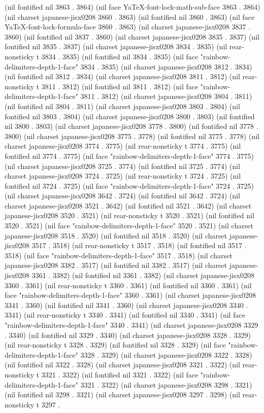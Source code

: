 (nil fontified nil 3863 . 3864) (nil face YaTeX-font-lock-math-sub-face 3863 . 3864) (nil charset japanese-jisx0208 3860 . 3863) (nil fontified nil 3860 . 3863) (nil face YaTeX-font-lock-formula-face 3860 . 3863) (nil charset japanese-jisx0208 3837 . 3860) (nil fontified nil 3837 . 3860) (nil charset japanese-jisx0208 3835 . 3837) (nil fontified nil 3835 . 3837) (nil charset japanese-jisx0208 3834 . 3835) (nil rear-nonsticky t 3834 . 3835) (nil fontified nil 3834 . 3835) (nil face "rainbow-delimiters-depth-1-face" 3834 . 3835) (nil charset japanese-jisx0208 3812 . 3834) (nil fontified nil 3812 . 3834) (nil charset japanese-jisx0208 3811 . 3812) (nil rear-nonsticky t 3811 . 3812) (nil fontified nil 3811 . 3812) (nil face "rainbow-delimiters-depth-1-face" 3811 . 3812) (nil charset japanese-jisx0208 3804 . 3811) (nil fontified nil 3804 . 3811) (nil charset japanese-jisx0208 3803 . 3804) (nil fontified nil 3803 . 3804) (nil charset japanese-jisx0208 3800 . 3803) (nil fontified nil 3800 . 3803) (nil charset japanese-jisx0208 3778 . 3800) (nil fontified nil 3778 . 3800) (nil charset japanese-jisx0208 3775 . 3778) (nil fontified nil 3775 . 3778) (nil charset japanese-jisx0208 3774 . 3775) (nil rear-nonsticky t 3774 . 3775) (nil fontified nil 3774 . 3775) (nil face "rainbow-delimiters-depth-1-face" 3774 . 3775) (nil charset japanese-jisx0208 3725 . 3774) (nil fontified nil 3725 . 3774) (nil charset japanese-jisx0208 3724 . 3725) (nil rear-nonsticky t 3724 . 3725) (nil fontified nil 3724 . 3725) (nil face "rainbow-delimiters-depth-1-face" 3724 . 3725) (nil charset japanese-jisx0208 3642 . 3724) (nil fontified nil 3642 . 3724) (nil charset japanese-jisx0208 3521 . 3642) (nil fontified nil 3521 . 3642) (nil charset japanese-jisx0208 3520 . 3521) (nil rear-nonsticky t 3520 . 3521) (nil fontified nil 3520 . 3521) (nil face "rainbow-delimiters-depth-1-face" 3520 . 3521) (nil charset japanese-jisx0208 3518 . 3520) (nil fontified nil 3518 . 3520) (nil charset japanese-jisx0208 3517 . 3518) (nil rear-nonsticky t 3517 . 3518) (nil fontified nil 3517 . 3518) (nil face "rainbow-delimiters-depth-1-face" 3517 . 3518) (nil charset japanese-jisx0208 3382 . 3517) (nil fontified nil 3382 . 3517) (nil charset japanese-jisx0208 3361 . 3382) (nil fontified nil 3361 . 3382) (nil charset japanese-jisx0208 3360 . 3361) (nil rear-nonsticky t 3360 . 3361) (nil fontified nil 3360 . 3361) (nil face "rainbow-delimiters-depth-1-face" 3360 . 3361) (nil charset japanese-jisx0208 3341 . 3360) (nil fontified nil 3341 . 3360) (nil charset japanese-jisx0208 3340 . 3341) (nil rear-nonsticky t 3340 . 3341) (nil fontified nil 3340 . 3341) (nil face "rainbow-delimiters-depth-1-face" 3340 . 3341) (nil charset japanese-jisx0208 3329 . 3340) (nil fontified nil 3329 . 3340) (nil charset japanese-jisx0208 3328 . 3329) (nil rear-nonsticky t 3328 . 3329) (nil fontified nil 3328 . 3329) (nil face "rainbow-delimiters-depth-1-face" 3328 . 3329) (nil charset japanese-jisx0208 3322 . 3328) (nil fontified nil 3322 . 3328) (nil charset japanese-jisx0208 3321 . 3322) (nil rear-nonsticky t 3321 . 3322) (nil fontified nil 3321 . 3322) (nil face "rainbow-delimiters-depth-1-face" 3321 . 3322) (nil charset japanese-jisx0208 3298 . 3321) (nil fontified nil 3298 . 3321) (nil charset japanese-jisx0208 3297 . 3298) (nil rear-nonsticky t 3297 . 